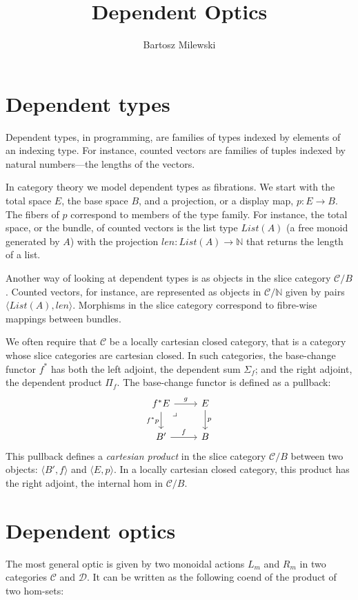 \documentclass[11pt]{amsart}
\author{Bartosz Milewski}
\title{Dependent Optics}
\begin{document}
\maketitle{}

\section{Dependent types}

Dependent types, in programming, are families of types indexed by elements of an indexing type. For instance, counted vectors are families of tuples indexed by natural numbers---the lengths of the vectors.

In category theory we model dependent types as fibrations. We start with the total space $E$, the base space $B$, and a projection, or a display map, $p \colon E \to B$. The fibers of $p$ correspond to members of the type family. For instance, the total space, or the bundle, of counted vectors is the list type $\mathit{List} (A)$ (a free monoid generated by $A$) with the projection $\mathit{len} \colon \mathit{List} (A) \to \mathbb{N}$ that returns the length of a list.

Another way of looking at dependent types is as objects in the slice category $\mathcal{C}/B$. Counted vectors, for instance, are represented as objects in $\mathcal{C}/\mathbb{N}$ given by pairs $\langle \mathit{List} (A), \mathit{len} \rangle$.   Morphisms in the slice category correspond to fibre-wise mappings between bundles.

We often require that $\mathcal{C}$ be a locally cartesian closed category, that is a category whose slice categories are cartesian closed. In such categories, the base-change functor $f^*$ has both the left adjoint, the dependent sum $\Sigma_f$; and the right adjoint, the dependent product $\Pi_f$. The base-change functor is defined as a pullback:
\[
 \begin{tikzcd}
f^* E
\arrow[dr, phantom,  , very near start, "\lrcorner"]
 \arrow[d, "f^*p"']
 \arrow[r, "g"]
 & E
 \arrow[d, "p"]
 \\
 B'
 \arrow[r, "f"]
 &B
  \end{tikzcd}
\]
This pullback defines a \emph{cartesian product} in the slice category $\mathcal{C}/B$ between two objects: $\langle B', f \rangle$ and $\langle E, p \rangle$. In a locally cartesian closed category, this product has the right adjoint, the internal hom in $\mathcal{C}/B$.

\section{Dependent optics}
The most general optic is given by two monoidal actions $L_m$ and $R_m$ in two categories  $\mathcal{C}$ and $ \mathcal{D}$. It can be written as the following coend of the product of two hom-sets:
\end{document}
